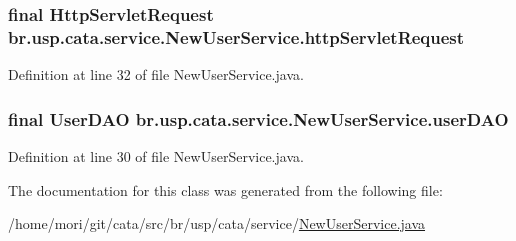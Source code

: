 \hypertarget{classbr_1_1usp_1_1cata_1_1service_1_1_new_user_service_a0f83da9b9dfcb3a750d110971e7d6086}{
\subsubsection[{http\+Servlet\+Request}]{\setlength{\rightskip}{0pt plus 5cm}final Http\+Servlet\+Request br.\+usp.\+cata.\+service.\+New\+User\+Service.\+http\+Servlet\+Request\hspace{0.3cm}{\ttfamily [private]}}}\label{classbr_1_1usp_1_1cata_1_1service_1_1_new_user_service_a0f83da9b9dfcb3a750d110971e7d6086}


Definition at line 32 of file New\+User\+Service.\+java.

\hypertarget{classbr_1_1usp_1_1cata_1_1service_1_1_new_user_service_a67d4700db9bda321b02d987085995a99}{
\subsubsection[{user\+D\+A\+O}]{\setlength{\rightskip}{0pt plus 5cm}final {\bf User\+D\+A\+O} br.\+usp.\+cata.\+service.\+New\+User\+Service.\+user\+D\+A\+O\hspace{0.3cm}{\ttfamily [private]}}}\label{classbr_1_1usp_1_1cata_1_1service_1_1_new_user_service_a67d4700db9bda321b02d987085995a99}


Definition at line 30 of file New\+User\+Service.\+java.



The documentation for this class was generated from the following file\+:\begin{DoxyCompactItemize}
\item 
/home/mori/git/cata/src/br/usp/cata/service/\hyperlink{_new_user_service_8java}{New\+User\+Service.\+java}\end{DoxyCompactItemize}
